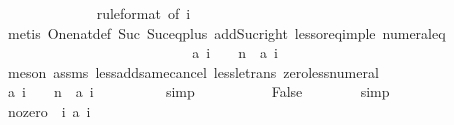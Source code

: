 \begin{isabellebody}
\ \ \ \ \ \ \ \ \ \ \ \ \isamarkupfalse%
\ {\isacharasterisk}{\isacharbrackleft}rule{\isacharunderscore}format{\isacharcomma}\ of\ {\isachardoublequoteopen}i{\isacharplus}{}{\isachardoublequoteclose}{\isacharbrackright}\isanewline
\ \ \ \ \ \ \ \ \ \ \ \ \isamarkupfalse%
\ {\isacharparenleft}metis\ One{\isacharunderscore}nat{\isacharunderscore}def\ Suc{\isacharunderscore}{}\ Suc{\isacharunderscore}eq{\isacharunderscore}plus{}\ add{\isacharunderscore}Suc{\isacharunderscore}right\ less{\isacharunderscore}or{\isacharunderscore}eq{\isacharunderscore}imp{\isacharunderscore}le\ numeral{\isacharunderscore}{}{\isacharunderscore}eq{\isacharunderscore}{}{\isacharparenright}\isanewline
\ \ \ \ \ \ \ \ \isamarkupfalse%
\isanewline
\ \ \ \ \ \ \isamarkupfalse%
\isanewline
\ \ \ \ \isamarkupfalse%
\isanewline
\isanewline
\ \ \ \ \isamarkupfalse%
\ \isamarkupfalse%
\ {\isachardoublequoteopen}{\isacharquery}a\ {\isacharparenleft}i\ {\isacharplus}\ {}\ {\isacharplus}\ n{\isacharparenright}\ {\isachargreater}\ {\isacharquery}a\ {\isacharparenleft}i\ {\isacharplus}\ {}{\isacharparenright}{\isachardoublequoteclose}\isanewline
\ \ \ \ \ \ \isamarkupfalse%
\ {\isacharparenleft}meson\ assms\ less{\isacharunderscore}add{\isacharunderscore}same{\isacharunderscore}cancel{}\ less{\isacharunderscore}le{\isacharunderscore}trans\ zero{\isacharunderscore}less{\isacharunderscore}numeral{\isacharparenright}\isanewline
\isanewline
\ \ \ \ \isamarkupfalse%
\isanewline
\isanewline
\ \ \ \ \isamarkupfalse%
\ {\isachardoublequoteopen}{\isacharquery}a\ {\isacharparenleft}i\ {\isacharplus}\ {}\ {\isacharplus}\ n{\isacharparenright}\ {\isacharequal}\ {\isacharquery}a\ {\isacharparenleft}i\ {\isacharplus}\ {}{\isacharparenright}{\isachardoublequoteclose}\isanewline
\ \ \ \ \ \ \isamarkupfalse%
\ simp\isanewline
\isanewline
\ \ \ \ \isamarkupfalse%
\isanewline
\isanewline
\ \ \ \ \isamarkupfalse%
\ False\isanewline
\ \ \ \ \ \ \isamarkupfalse%
\ simp\isanewline
\ \ \isamarkupfalse%
\isanewline
\isanewline
\ \ \isamarkupfalse%
\ no{\isacharunderscore}zero{\isacharcolon}\ {\isachardoublequoteopen}{\isasymforall}\ i{\isachardot}\ {\isacharquery}a\ i\ {\isasymnoteq}\ {}{\isachardoublequoteclose}\isanewline

\end{isabellebody}
